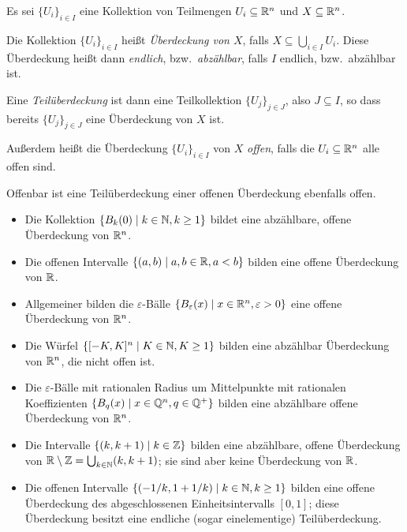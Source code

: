 \documentclass[a4paper,10pt]{article}
\begin{document}
\begin{defi}
 Es sei $\{U_i\}_{i \in I}$ eine Kollektion von Teilmengen $U_i \subseteq \mathbb{R}^n$ und $X \subseteq \mathbb{R}^n$.
 
 Die Kollektion $\{U_i\}_{i \in I}$ heißt \emph{Überdeckung von $X$}, falls $X \subseteq \bigcup_{i \in I} U_i$. Diese Überdeckung heißt dann \emph{endlich}, bzw.\ \emph{abzählbar}, falls $I$ endlich, bzw.\ abzählbar ist.
 
 Eine \emph{Teilüberdeckung} ist dann eine Teilkollektion $\{U_j\}_{j \in J}$, also $J \subseteq I$, so dass bereits $\{U_j\}_{j \in J}$ eine Überdeckung von $X$ ist.
 
 Außerdem heißt die Überdeckung $\{U_i\}_{i \in I}$ von $X$ \emph{offen}, falls die $U_i \subseteq \mathbb{R}^n$ alle offen sind.
\end{defi}


\begin{bem}
 Offenbar ist eine Teilüberdeckung einer offenen Überdeckung ebenfalls offen.
\end{bem}


\begin{bsp}
 \begin{itemize}
  \item
   Die Kollektion $\{B_k(0) \mid k \in \mathbb{N}, k \geq 1\}$ bildet eine abzählbare, offene Überdeckung von $\mathbb{R}^n$.
  \item
   Die offenen Intervalle $\{(a,b) \mid a,b \in \mathbb{R}, a < b\}$ bilden eine offene Überdeckung von $\mathbb{R}$.
  \item
   Allgemeiner bilden die $\varepsilon$-Bälle $\{B_\varepsilon(x) \mid x \in \mathbb{R}^n, \varepsilon > 0\}$ eine offene Überdeckung von $\mathbb{R}^n$.
  \item
   Die Würfel $\{[-K,K]^n \mid K \in \mathbb{N}, K \geq 1\}$ bilden eine abzählbar Überdeckung von $\mathbb{R}^n$, die nicht offen ist.
  \item
   Die $\varepsilon$-Bälle mit rationalen Radius um Mittelpunkte mit rationalen Koeffizienten $\{B_q(x) \mid x \in \mathbb{Q}^n, q \in \mathbb{Q}^+\}$ bilden eine abzählbare offene Überdeckung von $\mathbb{R}^n$.
  \item
   Die Intervalle $\{(k,k+1) \mid k \in \mathbb{Z}\}$ bilden eine abzählbare, offene Überdeckung von $\mathbb{R} \setminus \mathbb{Z} = \bigcup_{k \in \mathbb{N}} (k,k+1)$; sie sind aber keine Überdeckung von $\mathbb{R}$.
  \item
   Die offenen Intervalle $\{ (-1/k, 1+1/k) \mid k \in \mathbb{N}, k \geq 1\}$ bilden eine offene Überdeckung des abgeschlossenen Einheitsintervalls $[0,1]$; diese Überdeckung besitzt eine endliche (sogar einelementige) Teilüberdeckung.
 \end{itemize}
\end{bsp}
\end{document}
